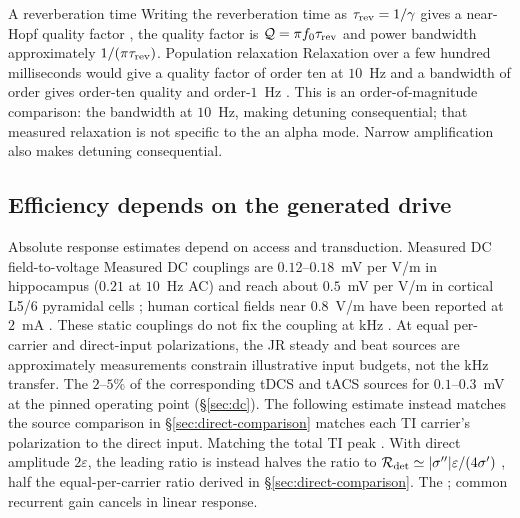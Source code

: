 \documentclass[11pt,a4paper]{article}
\newcommand{\Sig}{\sigma}
\providecommand{\DIFaddtex}[1]{{\protect\color{blue} \sf #1}} %
\providecommand{\DIFdeltex}[1]{{\protect\color{red} \scriptsize #1}} %
\providecommand{\DIFaddbegin}{} %
\providecommand{\DIFaddend}{} %
\providecommand{\DIFdelbegin}{} %
\providecommand{\DIFdelend}{} %
\providecommand{\DIFadd}[1]{\texorpdfstring{\DIFaddtex{#1}}{#1}} %
\providecommand{\DIFdel}[1]{\texorpdfstring{\DIFdeltex{#1}}{}} %
\begin{document}
\DIFdel{A reverberation
time }\DIFdelend \DIFaddbegin \DIFadd{Writing the reverberation
time as }\DIFaddend $\tau_{\rm rev}=1/\gamma$\DIFdelbegin \DIFdel{gives a near-Hopf
quality factor }\DIFdelend \DIFaddbegin \DIFadd{, the quality factor is
}\DIFaddend $\mathcal Q=\pi f_0\tau_{\rm rev}$ and power bandwidth approximately
$1/(\pi\tau_{\rm rev})$. \DIFdelbegin \DIFdel{Population relaxation }\DIFdelend \DIFaddbegin \DIFadd{Relaxation }\DIFaddend over a few hundred milliseconds
\cite{wilting2018} \DIFdelbegin \DIFdel{would give a quality factor of order ten at
$10$~Hz and a bandwidth of order }\DIFdelend \DIFaddbegin \DIFadd{gives order-ten quality and order-}\DIFaddend $1$~Hz \DIFdelbegin \DIFdel{. This is an order-of-magnitude comparison:
the }\DIFdelend \DIFaddbegin \DIFadd{bandwidth at
$10$~Hz, making detuning consequential; that }\DIFaddend measured relaxation is not
specific to \DIFdelbegin \DIFdel{the }\DIFdelend \DIFaddbegin \DIFadd{an }\DIFaddend alpha mode.
\DIFdelbegin \DIFdel{Narrow amplification
also makes detuning consequential.
}\DIFdelend

\subsection{Efficiency depends on the generated drive}
\DIFdelbegin \DIFdel{Absolute response estimates depend on access and transduction.
Measured DC field-to-voltage }\DIFdelend \DIFaddbegin \DIFadd{Measured DC }\DIFaddend couplings are $0.12$--$0.18$~mV per V/m in hippocampus
($0.21$ at $10$~Hz\DIFdelbegin \DIFdel{AC}\DIFdelend ) \cite{bikson2004,deans2007} and reach \DIFdelbegin \DIFdel{about
}\DIFdelend $0.5$~mV per V/m
in cortical L5/6 pyramidal cells \cite{radman2009}; human cortical fields near
$0.8$~V/m have been reported at $2$~mA \cite{huang2017,huang2017corr}.
These \DIFdelbegin \DIFdel{static couplings do
not fix the coupling at kHz . At equal per-carrier and direct-input polarizations,
the JR steady and beat sources are approximately }\DIFdelend \DIFaddbegin \DIFadd{measurements constrain illustrative input budgets, not the kHz transfer.
The }\DIFaddend $2$--$5\%$ \DIFdelbegin \DIFdel{of the corresponding
tDCS and tACS sources for $0.1$--$0.3$~mV at the pinned operating point
(\S\ref{sec:dc}). The following estimate instead matches
the }\DIFdelend \DIFaddbegin \DIFadd{source comparison in \S\ref{sec:direct-comparison} matches
each TI carrier's polarization to the direct input. Matching the }\DIFaddend total TI
peak \DIFdelbegin \DIFdel{.
With direct amplitude $2\varepsilon$, the leading ratio is
}\DIFdelend \DIFaddbegin \DIFadd{instead halves the ratio to
}\DIFaddend $\mathcal R_{\rm det}\simeq|\Sig''|\varepsilon/(4\Sig')$\DIFdelbegin \DIFdel{, half the equal-per-carrier
ratio derived in \S\ref{sec:direct-comparison}. The }\DIFdelend \DIFaddbegin \DIFadd{; }\DIFaddend common recurrent
gain cancels \DIFaddbegin \DIFadd{in linear response}\DIFaddend .
\end{document}
